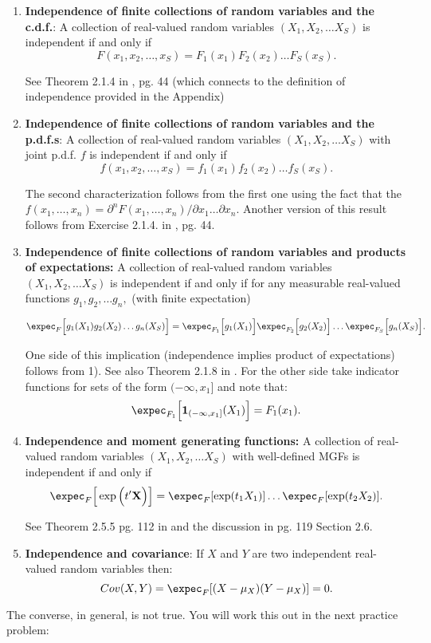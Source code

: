 \documentclass[11pt]{article} %
\begin{document}
\begin{enumerate}
\item \textbf{Independence of finite collections of random variables and the c.d.f.}: A collection of real-valued random variables $(X_1, X_2, \ldots X_S)$ is independent if and only if 
\begin{equation*}
F (x_1, x_2, \ldots ,x_S) = F_1(x_1)F_2(x_2) \ldots F_S(x_S).     
\end{equation*}

See Theorem 2.1.4 in \cite{durrett2010}, pg. 44 (which connects to the definition of independence provided in the Appendix)


\item \textbf{Independence of finite collections of random variables and the p.d.f.s}: A collection of real-valued random variables $(X_1, X_2, \ldots X_S)$ with joint p.d.f. $f$ is independent if and only if 
\begin{equation*}
f (x_1, x_2, \ldots ,x_S) = f_{1}(x_1)f_{2}(x_2) \ldots f_{S}(x_S).     
\end{equation*}

\noindent The second characterization follows from the first one using the fact that the $f(x_1, \ldots, x_n) = \partial^n F(x_1, \ldots, x_n)/ \partial x_1 \ldots \partial x_n$. Another version of this result follows from Exercise 2.1.4. in \cite{durrett2010}, pg. 44. 

\item \textbf{Independence of finite collections of random variables and products of expectations:} A collection of real-valued random variables $(X_1, X_2, \ldots X_S)$ is independent if and only if for any measurable real-valued functions $g_1, g_2, \ldots g_n,$ (with finite expectation)

$$\expec_{F} \Big[ g_1(X_1) g_2(X_2) \ldots g_n(X_S) \Big] = \expec_{F_{1}} \Big[ g_1(X_1) \Big] \expec_{F_{2}} \Big[ g_2(X_2) \Big] \ldots \expec_{F_{S}} \Big[ g_n(X_S) \Big].$$

\noindent One side of this implication (independence implies product of expectations) follows from 1). See also Theorem 2.1.8 in \cite{durrett2010}. For the other side take indicator functions for sets of the form $(-\infty, x_1]$ and note that:
$$\expec_{F_{1}} \Big[ \mathbf{1}_{(-\infty, x_1]} (X_1) \Big]=F_{1}(x_1).$$

\item \textbf{Independence and moment generating functions:} A collection of real-valued random variables $(X_1, X_2, \ldots X_S)$ with well-defined MGFs is independent if and only if 
$$\expec_{F} \Big[ \exp\Big( t' \mathbf{X} \Big) \Big] = \expec_{F}[\exp(t_1X_1) ] \ldots \expec_{F}[\exp(t_2X_2)].$$

See Theorem 2.5.5 pg. 112 in \cite{hogg} and the discussion in pg. 119 Section 2.6.

\item \textbf{Independence and covariance}: If $X$ and $Y$ are two independent real-valued random variables then:
$$Cov(X,Y)=\expec_{F}[(X-\mu_{X})(Y-\mu_{X})]=0.$$
\end{enumerate}
The converse, in general, is not true. You will work this out in the next practice problem:
\end{document}
